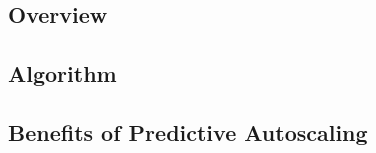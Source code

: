 \subsection{Overview}



\subsection{Algorithm}



\subsection{Benefits of Predictive Autoscaling}


